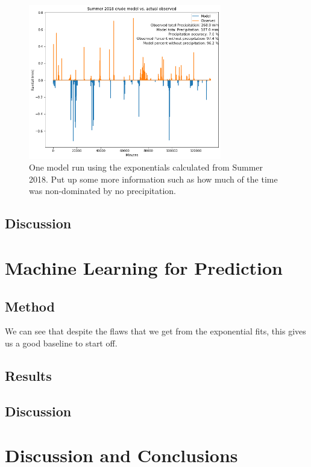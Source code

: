 \documentclass[11pt]{report}
\begin{document}
\begin{figure}[b]
  \centering
  \includegraphics[width=0.75\textwidth]{Figures/run_with_more_info.png}
  \caption[More  run using Summer 2018 climatology]
  {\label{crudesmodel} One model run using the exponentials calculated from
    Summer 2018. Put up some more information such as how much of the time
    was non-dominated by no precipitation.}
\end{figure}
\clearpage

\subsection{Discussion}\label{sec:spc_d}


\section{Machine Learning for Prediction}\label{sec:MLP}






\subsection{Method}
We can see that despite the flaws that we get from the exponential fits, this gives us a good baseline to start off. 
\subsection{Results}

\subsection{Discussion}


\clearpage

\section{Discussion and Conclusions}\label{sec:conclusions}

 

\small
\renewcommand{\bibsep}{0em}

\renewcommand{\bibname}{References}


\end{document}
